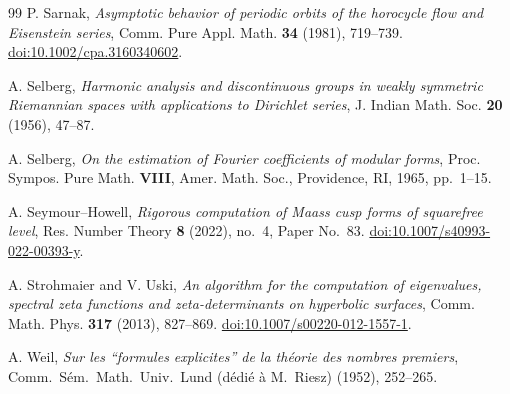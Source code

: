 \documentclass[12pt,a4paper]{article}
\theoremstyle{definition}
\theoremstyle{remark}
\begin{document}
\begin{thebibliography}{99}
P. Sarnak,
\emph{Asymptotic behavior of periodic orbits of the horocycle flow and Eisenstein series},
Comm. Pure Appl. Math. \textbf{34} (1981), 719--739.
\href{https://doi.org/10.1002/cpa.3160340602}{doi:10.1002/cpa.3160340602}.

A. Selberg,
\emph{Harmonic analysis and discontinuous groups in weakly symmetric Riemannian spaces with applications to Dirichlet series},
J. Indian Math. Soc. \textbf{20} (1956), 47--87.

A. Selberg,
\emph{On the estimation of Fourier coefficients of modular forms},
Proc. Sympos. Pure Math. \textbf{VIII}, Amer. Math. Soc., Providence, RI, 1965, pp.~1--15.

A. Seymour--Howell,
\emph{Rigorous computation of Maass cusp forms of squarefree level},
Res. Number Theory \textbf{8} (2022), no.~4, Paper No.~83.
\href{https://doi.org/10.1007/s40993-022-00393-y}{doi:10.1007/s40993-022-00393-y}.

A. Strohmaier and V. Uski,
\emph{An algorithm for the computation of eigenvalues, spectral zeta functions and zeta-determinants on hyperbolic surfaces},
Comm. Math. Phys. \textbf{317} (2013), 827--869.
\href{https://doi.org/10.1007/s00220-012-1557-1}{doi:10.1007/s00220-012-1557-1}.

A. Weil,
\emph{Sur les ``formules explicites'' de la théorie des nombres premiers},
Comm.\ Sém.\ Math.\ Univ.\ Lund (dédié à M.\ Riesz) (1952), 252--265.
\end{thebibliography}
\endgroup
\end{document}
